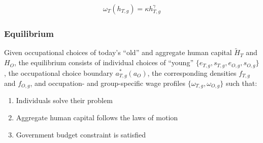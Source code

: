 \documentclass[11pt]{beamer}
\begin{document}
\begin{frame}
\begin{itemize}
\begin{align*}
					\omega_T(h_{T,g})  =  \kappa h_{T,g}^\gamma 
	\end{align*}
\end{itemize}

\end{frame}

\begin{frame}
\frametitle{Equilibrium}
\label{eqm}
Given occupational choices of today's ``old'' and aggregate human capital $\widetilde{H}_{T}$ and ${H}_{O}$, the equilibrium consists of individual choices of ``young'' $\{e_{T,g}, s_{T,g}, e_{O,g}, s_{O,g}\}$, the occupational choice boundary $a^*_{T,g}(a_O)$, the corresponding densities $f_{T,g}$ and $f_{O,g}$, and occupation- and group-specific wage profiles $\{\omega_{T,g}, \omega_{O,g}\}$ such that:
\begin{enumerate}
	\item Individuals solve their problem \hyperlink{time_inv}{} \hyperlink{good_inv}{}
	\item Aggregate human capital follows the laws of motion \hyperlink{laws}{}
	\item Government budget constraint is satisfied
\end{enumerate}
\end{frame}
\end{document}
